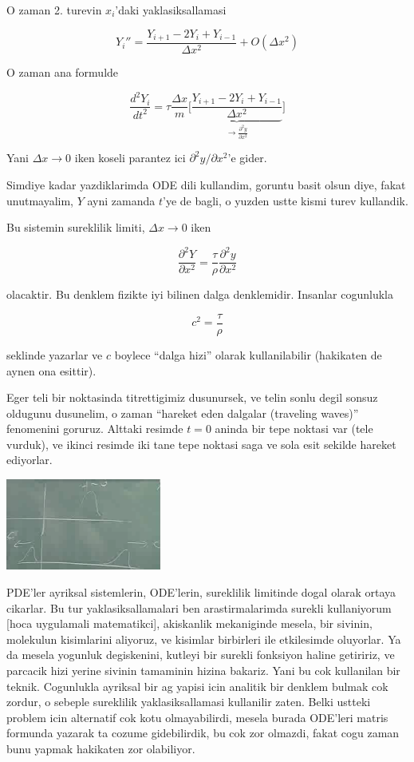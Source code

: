 \documentclass[12pt,fleqn]{article}
\begin{document}
O zaman 2. turevin $x_i$'daki yaklasiksallamasi 

\[ Y_i'' = \frac{Y_{i+1} - 2Y_i + Y_{i-1}}{\Delta x^2} + O(\Delta x^2) \]

O zaman ana formulde

\[ \frac{d^2Y_i}{dt^2} = 
\tau \frac{\Delta x}{m} \bigg[\underbrace{
\frac{Y_{i+1} - 2Y_i + Y_{i-1}}{\Delta x^2}
}_{\to \frac{\partial ^2y}{\partial x^2}}
\bigg]
\]

Yani $\Delta x \to 0$ iken koseli parantez ici $\partial ^2y/\partial
x^2$'e gider.

Simdiye kadar yazdiklarimda ODE dili kullandim, goruntu basit olsun diye,
fakat unutmayalim, $Y$ ayni zamanda $t$'ye de bagli, o yuzden ustte kismi
turev kullandik. 

Bu sistemin sureklilik limiti, $\Delta x \to 0$ iken

\[ 
\frac{\partial ^2Y}{\partial x^2} = 
\frac{\tau}{\rho}\frac{\partial ^2y}{\partial x^2}
 \]

olacaktir. Bu denklem fizikte iyi bilinen dalga denklemidir. Insanlar
cogunlukla 

\[ c^2 = \frac{\tau}{\rho} \]

seklinde yazarlar ve $c$ boylece ``dalga hizi'' olarak kullanilabilir
(hakikaten de aynen ona esittir). 

Eger teli bir noktasinda titrettigimiz dusunursek, ve telin sonlu degil
sonsuz oldugunu dusunelim, o zaman ``hareket eden dalgalar (traveling
waves)'' fenomenini goruruz. Alttaki resimde $t=0$ aninda bir tepe noktasi
var (tele vurduk), ve ikinci resimde iki tane tepe noktasi saga ve sola
esit sekilde hareket ediyorlar. 

\includegraphics[height=3cm]{1_10.png}

PDE'ler ayriksal sistemlerin, ODE'lerin, sureklilik limitinde dogal olarak
ortaya cikarlar. Bu tur yaklasiksallamalari ben arastirmalarimda surekli
kullaniyorum [hoca uygulamali matematikci], akiskanlik mekaniginde mesela,
bir sivinin, molekulun kisimlarini aliyoruz, ve kisimlar birbirleri ile
etkilesimde oluyorlar. Ya da mesela yogunluk degiskenini, kutleyi bir
surekli fonksiyon haline getiririz, ve parcacik hizi yerine sivinin
tamaminin hizina bakariz. Yani bu cok kullanilan bir teknik. Cogunlukla
ayriksal bir ag yapisi icin analitik bir denklem bulmak cok zordur, o
sebeple sureklilik yaklasiksallamasi kullanilir zaten. Belki ustteki
problem icin alternatif cok kotu olmayabilirdi, mesela burada ODE'leri
matris formunda yazarak ta cozume gidebilirdik, bu cok zor olmazdi, fakat
cogu zaman bunu yapmak hakikaten zor olabiliyor.
\end{document}
